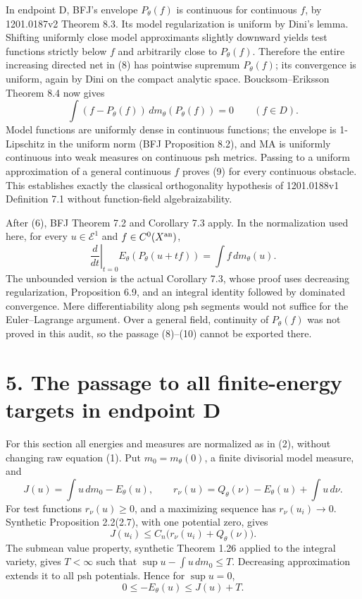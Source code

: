 \documentclass[11pt]{article}
\begin{document}
In endpoint D, BFJ's envelope \(P_\theta(f)\) is continuous for continuous \(f\), by 1201.0187v2 Theorem 8.3. Its model regularization is uniform by Dini's lemma. Shifting uniformly close model approximants slightly downward yields test functions strictly below \(f\) and arbitrarily close to \(P_\theta(f)\). Therefore the entire increasing directed net in (8) has pointwise supremum \(P_\theta(f)\); its convergence is uniform, again by Dini on the compact analytic space. Boucksom--Eriksson Theorem 8.4 now gives
\[
 \int(f-P_\theta(f))\,dm_\theta(P_\theta(f))=0
 \qquad(f\in D).
 \tag{9}
\]
Model functions are uniformly dense in continuous functions; the envelope is 1-Lipschitz in the uniform norm (BFJ Proposition 8.2), and MA is uniformly continuous into weak measures on continuous psh metrics. Passing to a uniform approximation of a general continuous \(f\) proves (9) for every continuous obstacle. This establishes exactly the classical orthogonality hypothesis of 1201.0188v1 Definition 7.1 without function-field algebraizability.

After (6), BFJ Theorem 7.2 and Corollary 7.3 apply. In the normalization used here, for every \(u\in\mathcal E^1\) and \(f\in C^0(X^{\rm an})\),
\[
 \left.\frac d{dt}\right|_{t=0}E_\theta(P_\theta(u+tf))
 =\int f\,dm_\theta(u).
 \tag{10}
\]
The unbounded version is the actual Corollary 7.3, whose proof uses decreasing regularization, Proposition 6.9, and an integral identity followed by dominated convergence. Mere differentiability along psh segments would not suffice for the Euler--Lagrange argument. Over a general field, continuity of \(P_\theta(f)\) was not proved in this audit, so the passage (8)--(10) cannot be exported there.

\section*{5. The passage to all finite-energy targets in endpoint D}

For this section all energies and measures are normalized as in (2), without changing raw equation (1). Put \(m_0=m_\theta(0)\), a finite divisorial model measure, and
\[
 J(u)=\int u\,dm_0-E_\theta(u),\qquad
 r_\nu(u)=Q_\theta(\nu)-E_\theta(u)+\int u\,d\nu.
 \tag{11}
\]
For test functions \(r_\nu(u)\geq0\), and a maximizing sequence has \(r_\nu(u_i)\to0\). Synthetic Proposition 2.2(2.7), with one potential zero, gives
\[
 J(u_i)\leq C_n\big(r_\nu(u_i)+Q_\theta(\nu)\big).
 \tag{12}
\]
The submean value property, synthetic Theorem 1.26 applied to the integral variety, gives \(T<\infty\) such that \(\sup u-\int u\,dm_0\leq T\). Decreasing approximation extends it to all psh potentials. Hence for \(\sup u=0\),
\[
 0\leq-E_\theta(u)\leq J(u)+T.
 \tag{13}
\]
\end{document}
